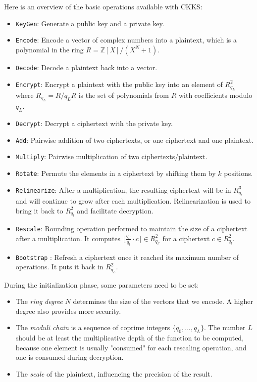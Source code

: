 \documentclass[a4paper,11pt,oneside]{report}
\begin{document}
Here is an overview of the basic operations available with CKKS:
\begin{itemize}
    \item \texttt{KeyGen}: Generate a public key and a private key.
    \item \texttt{Encode}: Encode a vector of complex numbers into a plaintext, which is a polynomial in the ring $R = \mathbb{Z}[X]/(X^N + 1)$.
    \item \texttt{Decode}: Decode a plaintext back into a vector.
    \item \texttt{Encrypt}: Encrypt a plaintext with the public key into an element of $R_{q_L}^2$ where $R_{q_L} = R/{q_L}R$ is the set of polynomials from $R$ with coefficients modulo ${q_L}$.
    \item \texttt{Decrypt}: Decrypt a ciphertext with the private key.
    \item \texttt{Add}: Pairwise addition of two ciphertexts, or one ciphertext and one plaintext.
    \item \texttt{Multiply}: Pairwise multiplication of two ciphertexts/plaintext.
    \item \texttt{Rotate}: Permute the elements in a ciphertext by shifting them by $k$ positions.
    \item \texttt{Relinearize}: After a multiplication, the resulting ciphertext will be in $R_{q_l}^3$ and will continue to grow after each multiplication. 
    Relinearization is used to bring it back to $R_{q_l}^2$ and facilitate decryption.
    \item \texttt{Rescale}: Rounding operation performed to maintain the size of a ciphertext after a multiplication. It computes $\lfloor \frac{q_{l'}}{q_l} \cdot c \rceil \in R_{q_{l'}}^2$ for a ciphertext $c \in R_{q_l}^2$.
    \item \texttt{Bootstrap} \cite{cheon_bootstrapping_2018}: Refresh a ciphertext once it reached its maximum number of operations. It puts it back in $R_{q_L}^2$.
\end{itemize}

During the initialization phase, some parameters need to be set:

\begin{itemize}
  \item The \emph{ring degree} $N$ determines the size of the vectors that we encode. A higher degree also provides more security.
  \item The \emph{moduli chain} is a sequence of coprime integers $\{ q_0, ..., q_L \}$. 
  The number $L$ should be at least the multiplicative depth of the function to be computed, because one element is usually "consumed" for each rescaling operation, and one is consumed during decryption.
  \item The \emph{scale} of the plaintext, influencing the precision of the result.
\end{itemize}
\end{document}
